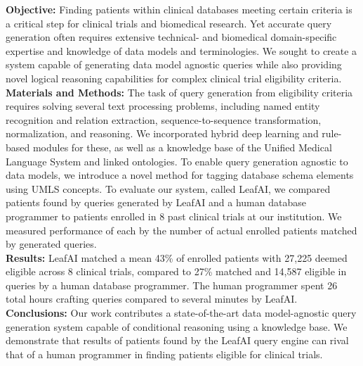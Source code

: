 \documentclass[../main.tex]{subfiles}
\begin{document}
\noindent\textbf{Objective:} Finding patients within clinical databases meeting certain criteria is a critical step for clinical trials and biomedical research. Yet accurate query generation often requires extensive technical- and biomedical domain-specific expertise and knowledge of data models and terminologies. We sought to create a system capable of generating data model agnostic queries while also providing novel logical reasoning capabilities for complex clinical trial eligibility criteria. \\

\noindent\textbf{Materials and Methods:} The task of query generation from eligibility criteria requires solving several text processing problems, including named entity recognition and relation extraction, sequence-to-sequence transformation, normalization, and reasoning. We incorporated hybrid deep learning and rule-based modules for these, as well as a knowledge base of the Unified Medical Language System and linked ontologies. To enable query generation agnostic to data models, we introduce a novel method for tagging database schema elements using UMLS concepts. To evaluate our system, called LeafAI, we compared patients found by queries generated by LeafAI and a human database programmer to patients enrolled in 8 past clinical trials at our institution. We measured performance of each by the number of actual enrolled patients matched by generated queries. \\

\noindent\textbf{Results:} LeafAI matched a mean 43\% of enrolled patients with 27,225 deemed eligible across 8 clinical trials, compared to 27\% matched and 14,587 eligible in queries by a human database programmer. The human programmer spent 26 total hours crafting queries compared to several minutes by LeafAI. \\

\noindent\textbf{Conclusions:} Our work contributes a state-of-the-art data model-agnostic query generation system capable of conditional reasoning using a knowledge base. We demonstrate that results of patients found by the LeafAI query engine can rival that of a human programmer in finding patients eligible for clinical trials.
\end{document}
